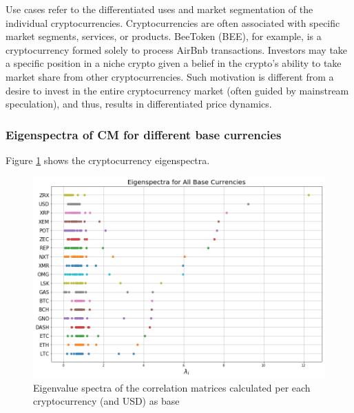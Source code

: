 \documentclass[a4paper]{article}
\begin{document}
\begin{multicols}{2}
Use cases refer to the differentiated uses and market segmentation of the individual cryptocurrencies. Cryptocurrencies are often associated with specific market segments, services, or products. BeeToken (BEE), for example, is a cryptocurrency formed solely to process AirBnb transactions. Investors may take a specific position in a niche crypto given a belief in the crypto’s ability to take market share from other cryptocurrencies. Such motivation is different from a desire to invest in the entire cryptocurrency market (often guided by mainstream speculation), and thus, results in differentiated price dynamics.

\subsubsection{Eigenspectra of CM for different base currencies}
Figure \ref{fig:eigenspectra} shows the cryptocurrency eigenspectra.
\end{multicols}
\begin{figure}[H]
\centering
    \includegraphics[totalheight=8cm]{Eigenspectra.png}
    \caption{Eigenvalue spectra of the correlation matrices calculated per each cryptocurrency (and USD) as base}	
    \label{fig:eigenspectra}
\end{figure}
\end{document}
